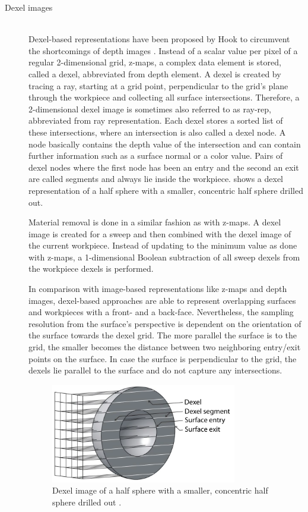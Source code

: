 \begin{description}
	\item[Dexel images] \hfill \\
	Dexel-based representations have been proposed by Hook to circumvent the shortcomings of depth images \cite{dexel}.
	Instead of a scalar value per pixel of a regular 2-dimensional grid, z-maps, a complex data element is stored, called a dexel, abbreviated from depth element.
	A dexel is created by tracing a ray, starting at a grid point, perpendicular to the grid's plane through the workpiece and collecting all surface intersections.
	Therefore, a 2-dimensional dexel image is sometimes also referred to as ray-rep, abbreviated from ray representation.
	Each dexel stores a sorted list of these intersections, where an intersection is also called a dexel node.
	A node basically contains the depth value of the intersection and can contain further information such as a surface normal or a color value.
	Pairs of dexel nodes where the first node has been an entry and the second an exit are called segments and always lie inside the workpiece.
	 shows a dexel representation of a half sphere with a smaller, concentric half sphere drilled out.

	Material removal is done in a similar fashion as with z-maps.
	A dexel image is created for a sweep and then combined with the dexel image of the current workpiece.
	Instead of updating to the minimum value as done with z-maps, a 1-dimensional Boolean subtraction of all sweep dexels from the workpiece dexels is performed.

	In comparison with image-based representations like z-maps and depth images, dexel-based approaches are able to represent overlapping surfaces and workpieces with a front- and a back-face.
	Nevertheless, the sampling resolution from the surface's perspective is dependent on the orientation of the surface towards the dexel grid.
	The more parallel the surface is to the grid, the smaller becomes the distance between two neighboring entry/exit points on the surface.
	In case the surface is perpendicular to the grid, the dexels lie parallel to the surface and do not capture any intersections.

	\begin{figure}[H]
		\centering
		\includegraphics[width=0.8\textwidth]{images/dexels}
		\caption{
			Dexel image of a half sphere with a smaller, concentric half sphere drilled out \cite{virtual_machining_review}.
		}
		\label{fig:dexel_image}
	\end{figure}



\end{description}
